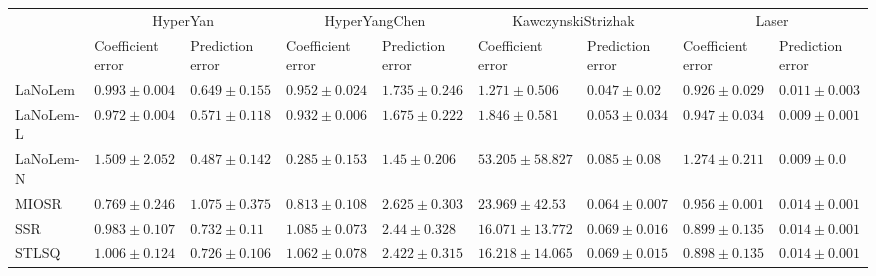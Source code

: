 \begin{table*}
{\begin{tabular}{lllllllll}
 & \multicolumn{2}{c}{HyperYan} & \multicolumn{2}{c}{HyperYangChen} & \multicolumn{2}{c}{KawczynskiStrizhak} & \multicolumn{2}{c}{Laser} \\
 & Coefficient error & Prediction error & Coefficient error & Prediction error & Coefficient error & Prediction error & Coefficient error & Prediction error \\
\midrule
LaNoLem & $0.993\pm 0.004$ & $0.649\pm 0.155$ & $0.952\pm 0.024$ & $1.735\pm 0.246$ & $\mathbf{1.271}\pm 0.506$ & $\mathbf{0.047}\pm 0.02$ & $0.926\pm 0.029$ & $0.011\pm 0.003$ \\
LaNoLem-L & $0.972\pm 0.004$ & $0.571\pm 0.118$ & $0.932\pm 0.006$ & $1.675\pm 0.222$ & $1.846\pm 0.581$ & $0.053\pm 0.034$ & $0.947\pm 0.034$ & $0.009\pm 0.001$ \\
LaNoLem-N & $1.509\pm 2.052$ & $\mathbf{0.487}\pm 0.142$ & $\mathbf{0.285}\pm 0.153$ & $\mathbf{1.45}\pm 0.206$ & $53.205\pm 58.827$ & $0.085\pm 0.08$ & $1.274\pm 0.211$ & $\mathbf{0.009}\pm 0.0$ \\
MIOSR & $\mathbf{0.769}\pm 0.246$ & $1.075\pm 0.375$ & $0.813\pm 0.108$ & $2.625\pm 0.303$ & $23.969\pm 42.53$ & $0.064\pm 0.007$ & $0.956\pm 0.001$ & $0.014\pm 0.001$ \\
SSR & $0.983\pm 0.107$ & $0.732\pm 0.11$ & $1.085\pm 0.073$ & $2.44\pm 0.328$ & $16.071\pm 13.772$ & $0.069\pm 0.016$ & $0.899\pm 0.135$ & $0.014\pm 0.001$ \\
STLSQ & $1.006\pm 0.124$ & $0.726\pm 0.106$ & $1.062\pm 0.078$ & $2.422\pm 0.315$ & $16.218\pm 14.065$ & $0.069\pm 0.015$ & $\mathbf{0.898}\pm 0.135$ & $0.014\pm 0.001$ \\

\midrule


\end{tabular}}
\end{table*}

